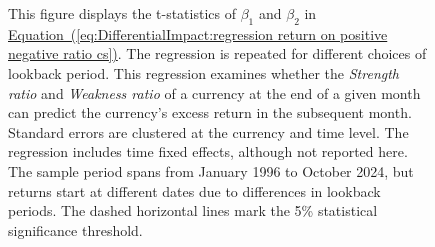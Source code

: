 \documentclass[12pt,oneside,letter]{article}
\newcommand*{\myeq}[1]{\hyperref[{#1}]{Equation~(\ref*{#1})}}
\begin{document}
\begin{landscape}
\begin{figure}
	
	    \begin{small}
	    This figure displays the t-statistics of \(\beta_1\) and \(\beta_2\) in \myeq{eq:DifferentialImpact:regression return on positive negative ratio cs}. The regression is repeated for different choices of lookback period. This regression examines whether the \textit{Strength ratio} and \textit{Weakness ratio} of a currency at the end of a given month can predict the currency's excess return in the subsequent month. Standard errors are clustered at the currency and time level. The regression includes time fixed effects, although not reported here. The sample period spans from January 1996 to October 2024, but returns start at different dates due to differences in lookback periods. The dashed horizontal lines mark the 5\% statistical significance threshold. 
	    \end{small}


	\end{figure}

\end{landscape}
\end{document}
